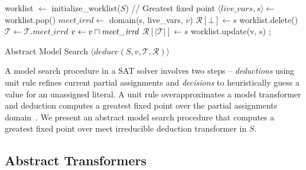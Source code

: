\begin{algorithm2e}[t]
\DontPrintSemicolon
{}
\begin{small}
worklist $\leftarrow$ initialize\_worklist($S$) \;
\Loop{}
{
// Greatest fixed point \;
{
  $\langle live\_vars, s \rangle \leftarrow$ worklist.pop() \;
  $\mathit{meet\_irrd} \leftarrow$ domain(s, live\_vars, $v$)\;
   {
    $\mathcal{R}[\bot] \leftarrow s$ \;
    worklist.delete() \;
    \return \conflict \;
  }
  \uElse
  {
    $\mathcal{T} \leftarrow \mathcal{T} . \mathit{meet\_irrd}$ \; 
    $v \leftarrow v \sqcap \mathit{meet\_irrd}$ \; 
    $\mathcal{R}[|\mathcal{T}|] \leftarrow s$ \;
    worklist.update(v, s) \; 
  }
}
 {
  \return \sat;
}
\uElse {
 \return \unknown \;
}
}
\end{small}
\caption{Abstract Model Search $\langle deduce(S,v,\mathcal{T},\mathcal{R}) \rangle$ \label{Alg:ms}}
\end{algorithm2e}
%  
A model search procedure in a SAT solver involves two steps -- {\em deductions} 
using unit rule refines current partial assignments and 
{\em decisions} to heuristically guess a value for an unassigned 
literal.  A unit rule overapproximates a model transformer and deduction 
computes a greatest fixed point over the partial assignments
domain~\cite{dhk2013-popl}.  We present an abstract model search procedure 
that computes a greatest fixed point over meet irreducible deduction 
transformer in $S$.  
%

\subsection{Abstract Transformers} \label{sec:abst}

